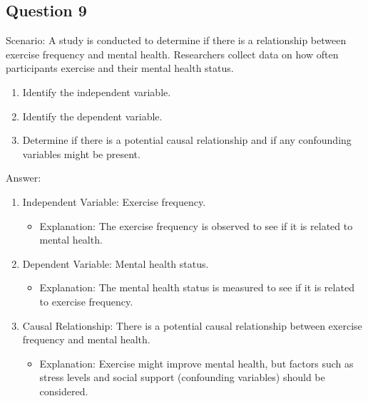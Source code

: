 \documentclass[
  letterpaper,
  DIV=11,
  numbers=noendperiod]{scrreprt}
\providecommand{\tightlist}{%
  \setlength{\itemsep}{0pt}\setlength{\parskip}{0pt}}\usepackage{longtable,booktabs,array}
\begin{document}
\subsection*{Question 9}\label{question-9}

Scenario: A study is conducted to determine if there is a relationship
between exercise frequency and mental health. Researchers collect data
on how often participants exercise and their mental health status.

\begin{enumerate}
\def\labelenumi{\arabic{enumi}.}
\tightlist
\item
  Identify the independent variable.
\item
  Identify the dependent variable.
\item
  Determine if there is a potential causal relationship and if any
  confounding variables might be present.
\end{enumerate}

Answer:

\begin{enumerate}
\def\labelenumi{\arabic{enumi}.}
\tightlist
\item
  Independent Variable: Exercise frequency.

  \begin{itemize}
  \tightlist
  \item
    Explanation: The exercise frequency is observed to see if it is
    related to mental health.
  \end{itemize}
\item
  Dependent Variable: Mental health status.

  \begin{itemize}
  \tightlist
  \item
    Explanation: The mental health status is measured to see if it is
    related to exercise frequency.
  \end{itemize}
\item
  Causal Relationship: There is a potential causal relationship between
  exercise frequency and mental health.

  \begin{itemize}
  \tightlist
  \item
    Explanation: Exercise might improve mental health, but factors such
    as stress levels and social support (confounding variables) should
    be considered.
  \end{itemize}
\end{enumerate}
\end{document}
